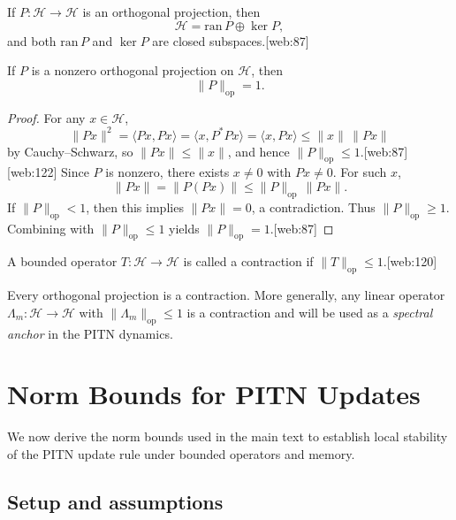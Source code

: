 \documentclass[11pt]{article}
\begin{document}
\begin{theorem}\label{thm:projection}
If \( P:\mathcal{H}\to\mathcal{H} \) is an orthogonal projection, then
\[
\mathcal{H} = \mathrm{ran}\,P \oplus \ker P,
\]
and both \( \mathrm{ran}\,P \) and \( \ker P \) are closed subspaces.[web:87]
\end{theorem}

\begin{proposition}\label{prop:projection-norm}
If \( P \) is a nonzero orthogonal projection on \( \mathcal{H} \), then
\[
\|P\|_{\mathrm{op}} = 1.
\]
\end{proposition}

\begin{proof}
For any \( x \in \mathcal{H} \),
\[
\|Px\|^2 = \langle Px, Px \rangle = \langle x, P^\ast Px \rangle = \langle x, Px \rangle \le \|x\|\,\|Px\|
\]
by Cauchy--Schwarz, so \( \|Px\| \le \|x\| \), and hence \( \|P\|_{\mathrm{op}} \le 1 \).[web:87][web:122]
Since \( P \) is nonzero, there exists \( x \neq 0 \) with \( Px \neq 0 \). For such \( x \),
\[
\|Px\| = \|P(Px)\| \le \|P\|_{\mathrm{op}} \,\|Px\|.
\]
If \( \|P\|_{\mathrm{op}} < 1 \), then this implies \( \|Px\| = 0 \), a contradiction. Thus \( \|P\|_{\mathrm{op}} \ge 1 \). Combining with \( \|P\|_{\mathrm{op}} \le 1 \) yields \( \|P\|_{\mathrm{op}} = 1 \).[web:87]
\end{proof}

\begin{definition}[Contraction]
A bounded operator \( T:\mathcal{H}\to\mathcal{H} \) is called a contraction if \( \|T\|_{\mathrm{op}} \le 1 \).[web:120]
\end{definition}

Every orthogonal projection is a contraction. More generally, any linear operator \( \Lambda_m:\mathcal{H} \to \mathcal{H} \) with \( \|\Lambda_m\|_{\mathrm{op}} \le 1 \) is a contraction and will be used as a \emph{spectral anchor} in the PITN dynamics.

\section{Norm Bounds for PITN Updates}

We now derive the norm bounds used in the main text to establish local stability of the PITN update rule under bounded operators and memory.

\subsection{Setup and assumptions}
\end{document}
